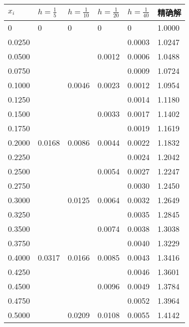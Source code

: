 \documentclass[12pt, a4paper, oneside]{ctexart}
\begin{document}
\begin{table}[h] %
    \centering
    \footnotesize
    \begin{minipage}[t]{0.48\textwidth}\centering
    \begin{tabular}{@{}llllll@{}}
    \toprule
    $x_i$      & $h=\frac{1}{5}$  & $h=\frac{1}{10}$ & $h=\frac{1}{20}$ & $h=\frac{1}{40}$ & 精确解    \\ \midrule
    0      & 0      & 0      & 0      & 0      & 1.0000 \\
    0.0250 &     &     &     & 0.0003 & 1.0247 \\
    0.0500 &     &     & 0.0012 & 0.0006 & 1.0488 \\
    0.0750 &     &     &     & 0.0009 & 1.0724 \\
    0.1000 &     & 0.0046 & 0.0023 & 0.0012 & 1.0954 \\
    0.1250 &     &     &     & 0.0014 & 1.1180 \\
    0.1500 &     &     & 0.0033 & 0.0017 & 1.1402 \\
    0.1750 &     &     &     & 0.0019 & 1.1619 \\
    0.2000 & 0.0168 & 0.0086 & 0.0044 & 0.0022 & 1.1832 \\
    0.2250 &     &     &     & 0.0024 & 1.2042 \\
    0.2500 &     &     & 0.0054 & 0.0027 & 1.2247 \\
    0.2750 &     &     &     & 0.0030 & 1.2450 \\
    0.3000 &     & 0.0125 & 0.0064 & 0.0032 & 1.2649 \\
    0.3250 &     &     &     & 0.0035 & 1.2845 \\
    0.3500 &     &     & 0.0074 & 0.0038 & 1.3038 \\
    0.3750 &     &     &     & 0.0040 & 1.3229 \\
    0.4000 & 0.0317 & 0.0166 & 0.0085 & 0.0043 & 1.3416 \\
    0.4250 &     &     &     & 0.0046 & 1.3601 \\
    0.4500 &     &     & 0.0096 & 0.0049 & 1.3784 \\
    0.4750 &     &     &     & 0.0052 & 1.3964 \\
    0.5000 &     & 0.0209 & 0.0108 & 0.0055 & 1.4142 \\ \bottomrule
    \end{tabular}
    \end{minipage}
    \begin{minipage}[t]{0.48\textwidth}\centering

\end{minipage}
\end{table}
\end{document}

